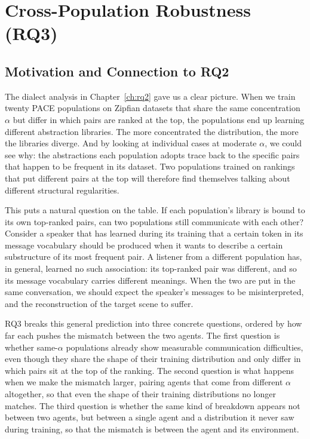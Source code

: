 \chapter{Cross-Population Robustness (RQ3)}
\label{ch:rq3}

\providecommand{\missingfigure}[1]{%
\fcolorbox{red}{white}{%
\parbox[c][0.14\textheight][c]{0.9\textwidth}{\centering\textcolor{red}{Placeholder figure\\\texttt{\detokenize{#1}}}}%
}%
}

\section{Motivation and Connection to RQ2}
\label{sec:rq3-motivation}

The dialect analysis in Chapter~\ref{ch:rq2} gave us a clear picture. When we train twenty PACE populations on Zipfian datasets that share the same concentration $\alpha$ but differ in which pairs are ranked at the top, the populations end up learning different abstraction libraries. The more concentrated the distribution, the more the libraries diverge. And by looking at individual cases at moderate $\alpha$, we could see why: the abstractions each population adopts trace back to the specific pairs that happen to be frequent in its dataset. Two populations trained on rankings that put different pairs at the top will therefore find themselves talking about different structural regularities.

This puts a natural question on the table. If each population's library is bound to its own top-ranked pairs, can two populations still communicate with each other? Consider a speaker that has learned during its training that a certain token in its message vocabulary should be produced when it wants to describe a certain substructure of its most frequent pair. A listener from a different population has, in general, learned no such association: its top-ranked pair was different, and so its message vocabulary carries different meanings. When the two are put in the same conversation, we should expect the speaker's messages to be misinterpreted, and the reconstruction of the target scene to suffer.

RQ3 breaks this general prediction into three concrete questions, ordered by how far each pushes the mismatch between the two agents. The first question is whether same-$\alpha$ populations already show measurable communication difficulties, even though they share the shape of their training distribution and only differ in which pairs sit at the top of the ranking. The second question is what happens when we make the mismatch larger, pairing agents that come from different $\alpha$ altogether, so that even the shape of their training distributions no longer matches. The third question is whether the same kind of breakdown appears not between two agents, but between a single agent and a distribution it never saw during training, so that the mismatch is between the agent and its environment.

